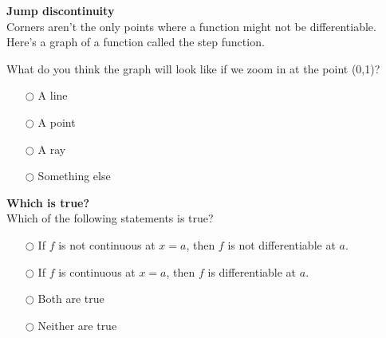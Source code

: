\documentclass[pdftex, brazil, 12pt, twoside]{article}
\begin{document}
\begin{exercise}
  \textbf{Jump discontinuity}\\%
  Corners aren't the only points where a function might not be differentiable.
  Here's a graph of a function called the step function.
  \begin{figure}[H]
    \begin{center}
    \end{center}
  \end{figure}
  What do you think the graph will look like if we zoom in at the point (0,1)?
  \begin{itemize}[noitemsep]
  \item[$\bigcirc$] A line
  \item[$\bigcirc$] A point
  \item[$\bigcirc$] A ray
  \item[$\bigcirc$] Something else
  \end{itemize}
\end{exercise}

\begin{exercise}
  \textbf{Which is true?}\\%
  Which of the following statements is true?
  \begin{itemize}[noitemsep]
  \item[$\bigcirc$] If $f$ is not continuous at $x=a$, then $f$ is not differentiable at $a$.
  \item[$\bigcirc$] If $f$ is continuous at $x=a$, then $f$ is differentiable at $a$.
  \item[$\bigcirc$] Both are true
  \item[$\bigcirc$] Neither are true
  \end{itemize}
\end{exercise}
\end{document}
